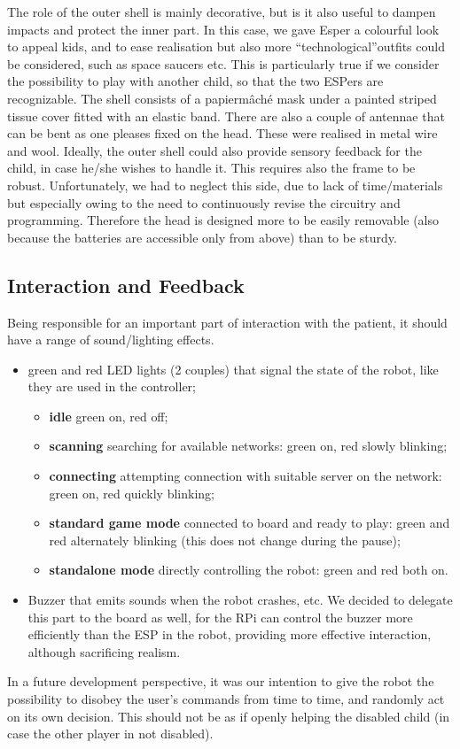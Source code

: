 \documentclass[a4paper,twoside]{book}
\begin{document}
The role of the outer shell is mainly decorative, but is it also useful to dampen impacts and protect the inner part. In this case, we gave Esper a colourful look to appeal kids, and to ease realisation but also more \textquotedblleft technological\textquotedblright outfits could be considered, such as space saucers etc. This is particularly true if we consider the possibility to play with another child, so that the two ESPers are recognizable.
The shell consists of a papier\textendash m\^{a}ch\'{e} mask under a painted striped tissue cover fitted with an elastic band. There are also a couple of antennae that can be bent as one pleases fixed on the head. These were realised in metal wire and wool.
Ideally, the outer shell could also provide sensory feedback for the child, in case he/she wishes to handle it.
This requires also the frame to be robust. Unfortunately, we had to neglect this side, due to lack of time/materials but especially owing to the need to continuously revise the circuitry and programming. Therefore the head is designed more to be easily removable (also because the batteries are accessible only from above) than to be sturdy.

\subsection{Interaction and Feedback}

Being responsible for an important part of interaction with the patient, it should have a range of sound/lighting effects.
\begin{itemize}
\item green and red LED lights (2 couples) that signal the state of the robot, like they are used in the controller;
	\begin{itemize}
	\item \textbf{idle} green on, red off;
	\item \textbf{scanning} searching for available networks: green on, red slowly blinking;
	\item \textbf{connecting} attempting connection with suitable server on the network: green on, red quickly blinking;
	\item \textbf{standard game mode} connected to board and ready to play: green and red alternately blinking (this does not change during the pause);
	\item \textbf{standalone mode} directly controlling the robot: green and red both on.
	\end{itemize}
\item Buzzer that emits sounds when the robot crashes, etc. We decided to delegate this part to the board as well, for the RPi can control the buzzer more efficiently than the ESP in the robot, providing more effective interaction, although sacrificing realism.
\end{itemize}
In a future development perspective, it was our intention to give the robot the possibility to disobey the user's commands from time to time, and randomly act on its own decision. This should not be as if openly helping the disabled child (in case the other player in not disabled).
\end{document}
